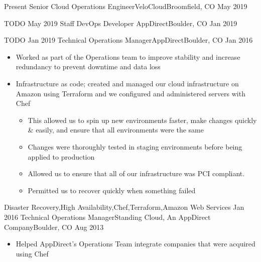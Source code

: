 \begin{experiences}
  \experience
    {Present}       {Senior Cloud Operations Engineer}{VeloCloud}{Broomfield, CO}
    {May 2019}      {
                      \begin{itemize}
                      \end{itemize}
                    }
                    {TODO}
  \emptySeparator
  \experience
    {May 2019}      {Staff DevOps Developer }{AppDirect}{Boulder, CO}
    {Jan 2019}      {
                      \begin{itemize}
                      \end{itemize}
                    }
                    {TODO}
  \emptySeparator
  \experience
    {Jan 2019}      {Technical Operations Manager}{AppDirect}{Boulder, CO}
    {Jan 2016}      {
                      \begin{itemize}
                        \item Worked as part of the Operations team to improve stability and increase redundancy to prevent downtime and data loss
                        \item Infrastructure as code; created and managed our cloud infrastructure on Amazon using Terraform and we configured and administered servers with Chef
                        \begin{itemize}
                          \item This allowed us to spin up new environments faster, make changes quickly \& easily, and ensure that all environments were the same
                          \item Changes were thoroughly tested in staging environments before being applied to production
                          \item Allowed us to ensure that all of our infrastructure was PCI compliant.
                          \item Permitted us to recover quickly when something failed
                        \end{itemize}
                      \end{itemize}
                    }
                    {Disaster Recovery,High Availability,Chef,Terraform,Amazon Web Services}
  \emptySeparator
  \experience
    {Jan 2016}      {Technical Operations Manager}{Standing Cloud, An AppDirect Company}{Boulder, CO}
    {Aug 2013}      {
                      \begin{itemize}
                        \item Helped AppDirect's Operations Team integrate companies that were acquired using Chef

\end{itemize}}
\end{experiences}
